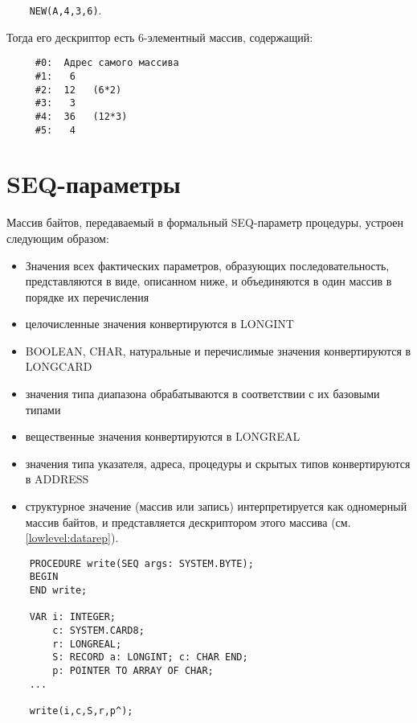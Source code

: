 \verb'    NEW(A,4,3,6)'.

Тогда его дескриптор есть 6-элементный массив, содержащий:

\begin{verbatim}
     #0:  Адрес самого массива
     #1:   6
     #2:  12   (6*2)
     #3:   3   
     #4:  36   (12*3)
     #5:   4
\end{verbatim}

\section{SEQ-параметры}\label{lowlevel:seqrep}  %

Массив байтов, передаваемый в формальный SEQ-параметр процедуры,
устроен следующим образом:
\begin{itemize}
\item
Значения всех фактических параметров, образующих последовательность,
представляются в виде, описанном ниже, и объединяются в один массив 
в порядке их перечисления
\item 
целочисленные значения конвертируются в LONGINT
\item BOOLEAN, CHAR, натуральные и перечислимые значения
конвертируются в LONGCARD
\item значения типа диапазона обрабатываются в соответствии с их базовыми
типами
\item 
вещественные значения конвертируются в LONGREAL
\item 
значения типа указателя, адреса, процедуры и скрытых типов
конвертируются в ADDRESS
\item
структурное значение (массив или запись) интерпретируется как %
одномерный массив байтов, и представляется дескриптором этого массива
(см. \ref{lowlevel:datarep}).
\end{itemize}

\Example
\begin{verbatim}
    PROCEDURE write(SEQ args: SYSTEM.BYTE);
    BEGIN
    END write;

    VAR i: INTEGER;
        c: SYSTEM.CARD8;
        r: LONGREAL;
        S: RECORD a: LONGINT; c: CHAR END;
        p: POINTER TO ARRAY OF CHAR;
    ...

    write(i,c,S,r,p^);
\end{verbatim}

